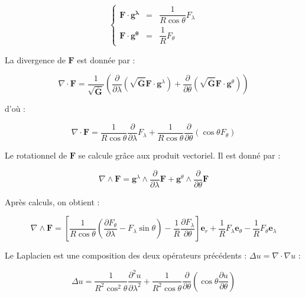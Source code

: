 $$
\left\lbrace 
\begin{array}{rcl}
\mathbf{F} \cdot \mathbf{g^{\lambda}} & = & \dfrac{1}{R \cos \theta} F_{\lambda} \\
\mathbf{F} \cdot \mathbf{g^{\theta}} & = & \dfrac{1}{R} F_{\theta}
\end{array}
\right.
$$

La divergence de $\mathbf{F}$ est donnée par :

\begin{equation}
\nabla \cdot \mathbf{F} = \dfrac{1}{\sqrt{\overline{\mathbf{G}}}} \left( \dfrac{\partial}{\partial \lambda} \left( \sqrt{\overline{\mathbf{G}}} \mathbf{F} \cdot \mathbf{g}^{\lambda}  \right) +  \dfrac{\partial}{\partial \theta} \left( \sqrt{\overline{\mathbf{G}}} \mathbf{F} \cdot \mathbf{g}^{\theta}  \right)  \right)
\end{equation}

d'où :

\begin{equation}\label{divergence_lonlat}
\nabla \cdot \mathbf{F} = \dfrac{1}{R \cos \theta} \dfrac{\partial}{\partial \lambda}  F_{\lambda} + \dfrac{1}{R \cos \theta} \dfrac{\partial}{\partial \theta} \left( \cos \theta F_{\theta} \right)
\end{equation}

Le rotationnel de $\mathbf{F}$ se calcule grâce aux produit vectoriel. Il est donné par :

\begin{equation}
\nabla \wedge \mathbf{F} = \mathbf{g}^{\lambda} \wedge \dfrac{\partial}{\partial \lambda}\mathbf{F} + \mathbf{g}^{\theta} \wedge \dfrac{\partial}{\partial \theta}\mathbf{F} 
\end{equation}

Après calculs, on obtient :

\begin{equation}\label{rotationnel_lonlat}
\nabla \wedge \mathbf{F} = \left[ \dfrac{1}{R \cos \theta} \left( \dfrac{\partial F_{\theta}}{\partial \lambda} - F_{\lambda} \sin \theta \right) - \dfrac{1}{R} \dfrac{\partial F_{\lambda}}{\partial \theta} \right] \mathbf{e}_{r} + \dfrac{1}{R} F_{\lambda} \mathbf{e}_{\theta} - \dfrac{1}{R} F_{\theta} \mathbf{e}_{\lambda} 
\end{equation}


Le Laplacien est une composition des deux opérateurs précédents : $\Delta u = \nabla \cdot \nabla u$ :

\begin{equation}\label{laplacien_lonlat}
\Delta u = \dfrac{1}{R^2 \cos^2 \theta} \dfrac{\partial^2 u }{\partial \lambda^2} + \dfrac{1}{R^2 \cos \theta} \dfrac{\partial}{\partial \theta} \left( \cos \theta \dfrac{\partial u}{\partial \theta} \right)
\end{equation}

